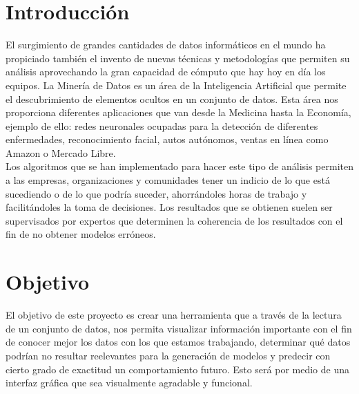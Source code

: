 \documentclass{article}
\title{}
\author{}
\date{}
\begin{document}

\tableofcontents
\setcounter{page}{2}
\newpage

\section{Introducción} 
El surgimiento de grandes cantidades de datos informáticos en el mundo ha propiciado también el invento de nuevas técnicas y metodologías
que permiten su análisis aprovechando la gran capacidad de cómputo que hay hoy en día los equipos. La Minería de Datos es
un área de la Inteligencia Artificial que permite el descubrimiento de elementos ocultos en un conjunto de datos. Esta área
nos proporciona diferentes aplicaciones que van desde la Medicina hasta la Economía, ejemplo de ello: redes neuronales ocupadas
para la detección de diferentes enfermedades, reconocimiento facial, autos autónomos, ventas en línea como Amazon o Mercado Libre. \\

\noindent Los algoritmos que se han implementado para hacer este tipo de análisis permiten a las empresas, organizaciones y comunidades tener
un indicio de lo que está sucediendo o de lo que podría suceder, ahorrándoles horas de trabajo y facilitándoles la toma de decisiones.
Los resultados que se obtienen suelen ser supervisados por expertos que determinen la coherencia de los resultados con el fin de no obtener
modelos erróneos.

\section{Objetivo}
El objetivo de este proyecto es crear una herramienta que a través de la lectura de un conjunto de datos, nos permita visualizar información importante
con el fin de conocer mejor los datos con los que estamos trabajando, determinar qué datos podrían no resultar reelevantes para la generación de modelos y
predecir con cierto grado de exactitud un comportamiento futuro. Esto será por medio de una interfaz gráfica que sea visualmente agradable y funcional.
\end{document}
